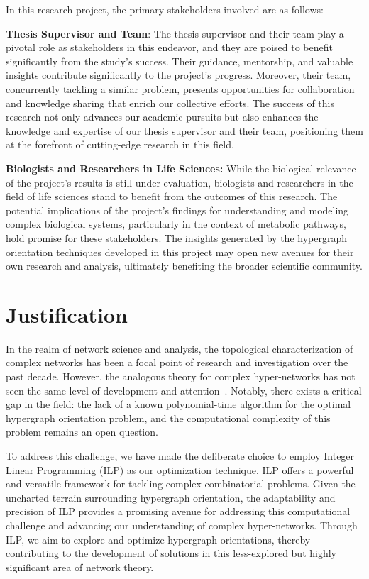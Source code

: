 In this research project, the primary stakeholders involved are as follows:
\begin{list}{}{\leftmargin=0em}
\item \textbf{Thesis Supervisor and Team}: The thesis supervisor and their team play a pivotal role as stakeholders in this endeavor, and they are poised to benefit significantly from the study's success. Their guidance, mentorship, and valuable insights contribute significantly to the project's progress. Moreover, their team, concurrently tackling a similar problem, presents opportunities for collaboration and knowledge sharing that enrich our collective efforts. The success of this research not only advances our academic pursuits but also enhances the knowledge and expertise of our thesis supervisor and their team, positioning them at the forefront of cutting-edge research in this field.
\item \textbf{Biologists and Researchers in Life Sciences:} While the biological relevance of the project's results is still under evaluation, biologists and researchers in the field of life sciences stand to benefit from the outcomes of this research. The potential implications of the project's findings for understanding and modeling complex biological systems, particularly in the context of metabolic pathways, hold promise for these stakeholders. The insights generated by the hypergraph orientation techniques developed in this project may open new avenues for their own research and analysis, ultimately benefiting the broader scientific community.
\end{list}

\section{Justification}
In the realm of network science and analysis, the topological characterization of complex networks has been a focal point of research and investigation over the past decade. However, the analogous theory for complex hyper-networks has not seen the same level of development and attention~\cite{Pearcy.Crofts.Chuzhanova:2014}. Notably, there exists a critical gap in the field: the lack of a known polynomial-time algorithm for the optimal hypergraph orientation problem, and the computational complexity of this problem remains an open question.

To address this challenge, we have made the deliberate choice to employ Integer Linear Programming (ILP) as our optimization technique. ILP offers a powerful and versatile framework for tackling complex combinatorial problems. Given the uncharted terrain surrounding hypergraph orientation, the adaptability and precision of ILP provides a promising avenue for addressing this computational challenge and advancing our understanding of complex hyper-networks. Through ILP, we aim to explore and optimize hypergraph orientations, thereby contributing to the development of solutions in this less-explored but highly significant area of network theory.

